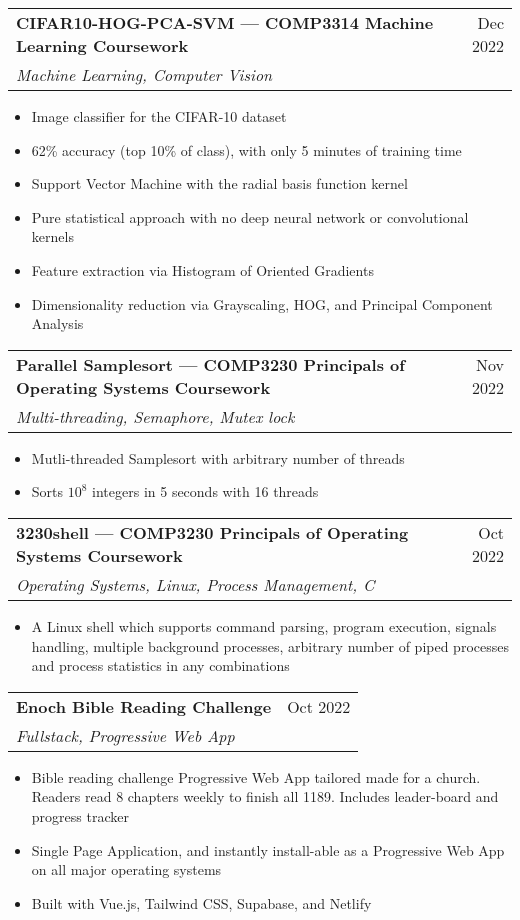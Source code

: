\documentclass{article}
\newcommand{\jobTitle}[3]{
\begin{tabularx}{\linewidth}{ X r }
    \textbf{#1} & #2\\
    \textit{#3} &
\end{tabularx}
}
\begin{document}
\jobTitle
{CIFAR10-HOG-PCA-SVM --- COMP3314 Machine Learning Coursework}
{Dec 2022}
{Machine Learning, Computer Vision}
\begin{itemize}
    \item Image classifier for the CIFAR-10 dataset
    \item 62\% accuracy (top 10\% of class), with only 5 minutes of training time
    \item Support Vector Machine with the radial basis function kernel
    \item Pure statistical approach with no deep neural network or convolutional kernels
    \item Feature extraction via Histogram of Oriented Gradients
    \item Dimensionality reduction via Grayscaling, HOG, and Principal Component Analysis
\end{itemize}

\jobTitle
{Parallel Samplesort --- COMP3230 Principals of Operating Systems Coursework}
{Nov 2022}
{Multi-threading, Semaphore, Mutex lock}
\begin{itemize}
    \item Mutli-threaded Samplesort with arbitrary number of threads
    \item Sorts $10^8$ integers in 5 seconds with 16 threads
\end{itemize}

\jobTitle
{3230shell --- COMP3230 Principals of Operating Systems Coursework}
{Oct 2022}
{Operating Systems, Linux, Process Management, C}
\begin{itemize}
    \item A Linux shell which supports command parsing, program execution, signals handling, multiple background processes, arbitrary number of piped processes and process statistics in any combinations
\end{itemize}

\jobTitle
{Enoch Bible Reading Challenge}
{Oct 2022}
{Fullstack, Progressive Web App}
\begin{itemize}
    \item Bible reading challenge Progressive Web App tailored made for a church. Readers read 8 chapters weekly to finish all 1189. Includes leader-board and progress tracker
	\item Single Page Application, and instantly install-able as a Progressive Web App on all major operating systems
    \item Built with Vue.js, Tailwind CSS, Supabase, and Netlify
\end{itemize}
\end{document}
